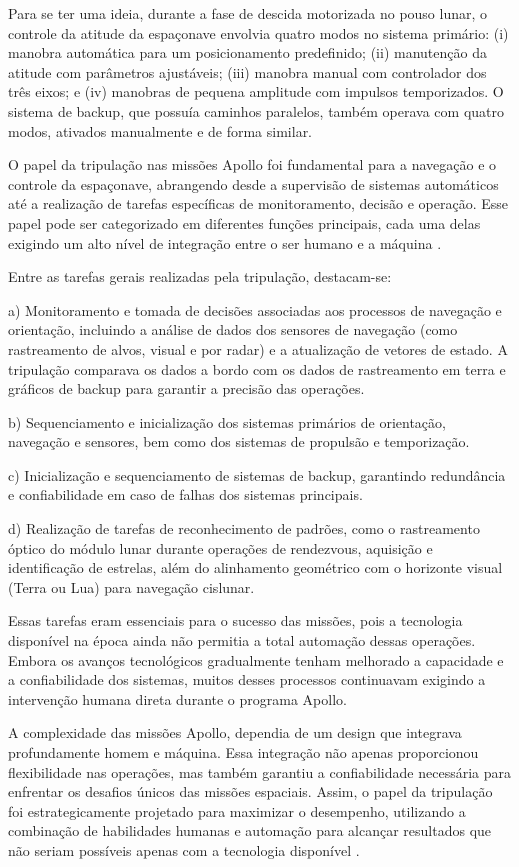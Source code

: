 Para se ter uma ideia, durante a fase de descida motorizada no pouso lunar, o controle da atitude da espaçonave envolvia quatro modos no sistema primário: (i) manobra automática para um posicionamento predefinido; (ii) manutenção da atitude com parâmetros ajustáveis; (iii) manobra manual com controlador dos três eixos; e (iv) manobras de pequena amplitude com impulsos temporizados. O sistema de backup, que possuía caminhos paralelos, também operava com quatro modos, ativados manualmente e de forma similar.

O papel da tripulação nas missões Apollo foi fundamental para a navegação e o controle da espaçonave, abrangendo desde a supervisão de sistemas automáticos até a realização de tarefas específicas de monitoramento, decisão e operação. Esse papel pode ser categorizado em diferentes funções principais, cada uma delas exigindo um alto nível de integração entre o ser humano e a máquina \citep{nevins1971}.

Entre as tarefas gerais realizadas pela tripulação, destacam-se:

a) Monitoramento e tomada de decisões associadas aos processos de navegação e orientação, incluindo a análise de dados dos sensores de navegação (como rastreamento de alvos, visual e por radar) e a atualização de vetores de estado. A tripulação comparava os dados a bordo com os dados de rastreamento em terra e gráficos de backup para garantir a precisão das operações.

b) Sequenciamento e inicialização dos sistemas primários de orientação, navegação e sensores, bem como dos sistemas de propulsão e temporização.

c) Inicialização e sequenciamento de sistemas de backup, garantindo redundância e confiabilidade em caso de falhas dos sistemas principais.

d) Realização de tarefas de reconhecimento de padrões, como o rastreamento óptico do módulo lunar durante operações de rendezvous, aquisição e identificação de estrelas, além do alinhamento geométrico com o horizonte visual (Terra ou Lua) para navegação cislunar.

Essas tarefas eram essenciais para o sucesso das missões, pois a tecnologia disponível na época ainda não permitia a total automação dessas operações. Embora os avanços tecnológicos gradualmente tenham melhorado a capacidade e a confiabilidade dos sistemas, muitos desses processos continuavam exigindo a intervenção humana direta durante o programa Apollo. 

A complexidade das missões Apollo, dependia de um design que integrava profundamente homem e máquina. Essa integração não apenas proporcionou flexibilidade nas operações, mas também garantiu a confiabilidade necessária para enfrentar os desafios únicos das missões espaciais. Assim, o papel da tripulação foi estrategicamente projetado para maximizar o desempenho, utilizando a combinação de habilidades humanas e automação para alcançar resultados que não seriam possíveis apenas com a tecnologia disponível \citep{nevins1971}.

